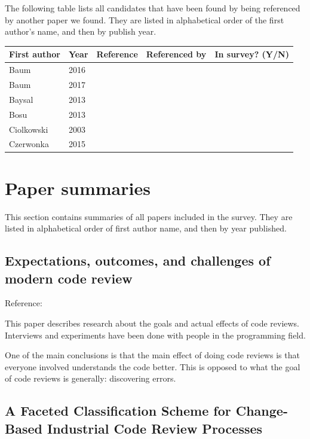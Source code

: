 \documentclass[]{book}
\begin{document}
The following table lists all candidates that have been found by being
referenced by another paper we found. They are listed in alphabetical
order of the first author's name, and then by publish year.

\begin{longtable}[]{@{}lllll@{}}
\toprule
First author & Year & Reference & Referenced by & In survey?
(Y/N)\tabularnewline
\midrule
\endhead
Baum & 2016 & \citet{baum2016faceted} & &\tabularnewline
Baum & 2017 & \citet{baum2017choice} & &\tabularnewline
Baysal & 2013 & \citet{baysal2013influence} & &\tabularnewline
Bosu & 2013 & \citet{bosu2013impact} & &\tabularnewline
Ciolkowski & 2003 & \citet{ciolkowski2003software} & &\tabularnewline
Czerwonka & 2015 & \citet{czerwonka2015code} & &\tabularnewline
\bottomrule
\end{longtable}

\section{Paper summaries}\label{paper-summaries}

This section contains summaries of all papers included in the survey.
They are listed in alphabetical order of first author name, and then by
year published.

\subsection{Expectations, outcomes, and challenges of modern code
review}\label{expectations-outcomes-and-challenges-of-modern-code-review}

Reference: \citet{bacchelli2013expectations}

This paper describes research about the goals and actual effects of code
reviews. Interviews and experiments have been done with people in the
programming field.

One of the main conclusions is that the main effect of doing code
reviews is that everyone involved understands the code better. This is
opposed to what the goal of code reviews is generally: discovering
errors.

\subsection{A Faceted Classification Scheme for Change-Based Industrial
Code Review
Processes}\label{a-faceted-classification-scheme-for-change-based-industrial-code-review-processes}
\end{document}
